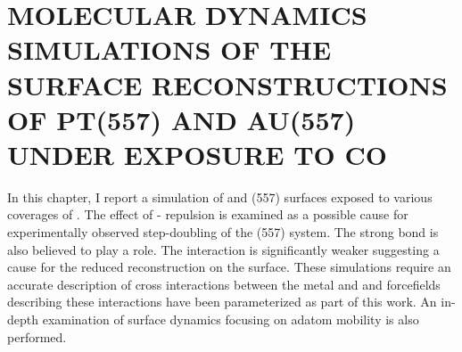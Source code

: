 \chapter{MOLECULAR DYNAMICS SIMULATIONS OF THE SURFACE RECONSTRUCTIONS OF PT(557) AND AU(557) UNDER EXPOSURE TO CO}
\label{chap:PtAu}





In this chapter, I report a simulation of  and  (557) surfaces
exposed to various coverages of . The effect of -
repulsion is examined as a possible cause for experimentally observed
step-doubling of the  (557) system. The strong  bond is
also believed to play a role. The  interaction is
significantly weaker suggesting a cause for the reduced reconstruction on the
 surface. These simulations require an accurate description of cross
interactions between the metal and  and forcefields describing these
interactions have been parameterized as part of this work. An in-depth
examination of surface dynamics focusing on adatom mobility is also performed.




